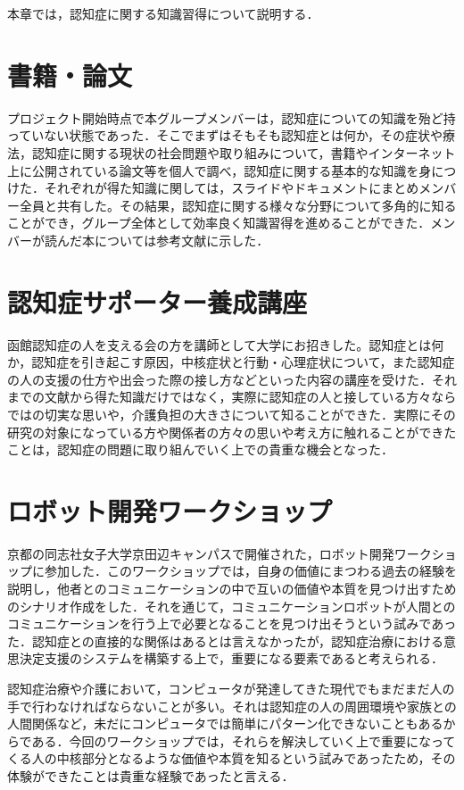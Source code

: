 \documentclass[../report]{subfiles}
\begin{document}
本章では，認知症に関する知識習得について説明する．

\section{書籍・論文}
プロジェクト開始時点で本グループメンバーは，認知症についての知識を殆ど持っていない状態であった．そこでまずはそもそも認知症とは何か，その症状や療法，認知症に関する現状の社会問題や取り組みについて，書籍やインターネット上に公開されている論文等を個人で調べ，認知症に関する基本的な知識を身につけた．それぞれが得た知識に関しては，スライドやドキュメントにまとめメンバー全員と共有した。その結果，認知症に関する様々な分野について多角的に知ることができ，グループ全体として効率良く知識習得を進めることができた．メンバーが読んだ本については参考文献に示した．

\section{認知症サポーター養成講座}
函館認知症の人を支える会の方を講師として大学にお招きした。認知症とは何か，認知症を引き起こす原因，中核症状と行動・心理症状について，また認知症の人の支援の仕方や出会った際の接し方などといった内容の講座を受けた．それまでの文献から得た知識だけではなく，実際に認知症の人と接している方々ならではの切実な思いや，介護負担の大きさについて知ることができた．実際にその研究の対象になっている方や関係者の方々の思いや考え方に触れることができたことは，認知症の問題に取り組んでいく上での貴重な機会となった．

\section{ロボット開発ワークショップ}
京都の同志社女子大学京田辺キャンパスで開催された，ロボット開発ワークショップに参加した．このワークショップでは，自身の価値にまつわる過去の経験を説明し，他者とのコミュニケーションの中で互いの価値や本質を見つけ出すためのシナリオ作成をした．それを通じて，コミュニケーションロボットが人間とのコミュニケーションを行う上で必要となることを見つけ出そうという試みであった．認知症との直接的な関係はあるとは言えなかったが，認知症治療における意思決定支援のシステムを構築する上で，重要になる要素であると考えられる．

認知症治療や介護において，コンピュータが発達してきた現代でもまだまだ人の手で行わなければならないことが多い。それは認知症の人の周囲環境や家族との人間関係など，未だにコンピュータでは簡単にパターン化できないこともあるからである．今回のワークショップでは，それらを解決していく上で重要になってくる人の中核部分となるような価値や本質を知るという試みであったため，その体験ができたことは貴重な経験であったと言える．
\end{document}
